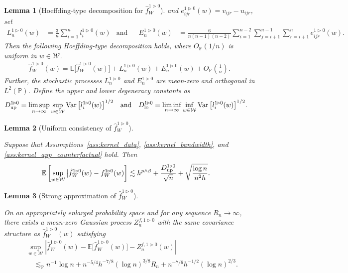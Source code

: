 \documentclass[11pt,lof]{puthesis}
\renewcommand{\P}{\ensuremath{\mathbb{P}}}
\newcommand{\E}{\ensuremath{\mathbb{E}}}
\newcommand{\cW}{\ensuremath{\mathcal{W}}}
\newcommand{\Dl}{\ensuremath{D_{\textup{lo}}}}
\newcommand{\Du}{\ensuremath{D_{\textup{up}}}}
\DeclareMathOperator{\Var}{Var}
\theoremstyle{break}
\newtheorem{lemma}{Lemma}[section]
\theoremstyle{proof}
\begin{document}
\begin{lemma}[Hoeffding-type decomposition for
$\hat f_W^{1 \triangleright 0}$]
and $e_{i j r}^{1 \triangleright 0}(w) = v_{i j r} - u_{i j r}$,
set
%
\begin{align*}
L_n^{1 \triangleright 0}(w)
&=
\frac{3}{n} \sum_{i=1}^n
l_i^{1 \triangleright 0}(w)
&\text{and} &
&E_n^{1 \triangleright 0}(w)
&=
\frac{6}{n(n-1)(n-2)}
\sum_{i=1}^{n-2}
\sum_{j=i+1}^{n-1}
\sum_{r=i+1}^n
e_{i j r}^{1 \triangleright 0}(w).
\end{align*}
%
Then the following Hoeffding-type decomposition holds,
where $O_\P(1/n)$ is uniform in $w \in \cW$.
%
\begin{align*}
\hat f_W^{1 \triangleright 0}(w)
= \E\big[\hat f_W^{1 \triangleright 0}(w)\big]
+ L_n^{1 \triangleright 0}(w)
+ E_n^{1 \triangleright 0}(w)
+ O_\P\left( \frac{1}{n} \right).
\end{align*}
%
Further,
the stochastic processes
$L_n^{1 \triangleright 0}$
and $E_n^{1 \triangleright 0}$
are mean-zero and orthogonal
in $L^2(\P)$.
Define the upper and lower degeneracy constants as
%
\begin{align*}
\Du^{1 \triangleright 0}
&=
\limsup_{n \to \infty}
\sup_{w \in \cW}
\Var\big[
l_i^{1 \triangleright 0}(w)
\big]^{1/2}
&\text{and}&
&
\Dl^{1 \triangleright 0}
&=
\liminf_{n \to \infty}
\inf_{w \in \cW}
\Var\big[
l_i^{1 \triangleright 0}(w)
\big]^{1/2}.
\end{align*}

\end{lemma}

\begin{lemma}[Uniform consistency of $\hat f_W^{1 \triangleright 0}$]
\label{lem:kernel_app_counterfactual_uniform_consistency}

Suppose that Assumptions~\ref{ass:kernel_data},
\ref{ass:kernel_bandwidth}, and \ref{ass:kernel_app_counterfactual} hold.
Then
%
\begin{align*}
\E\left[
\sup_{w \in \cW}
\big|\hat f_W^{1 \triangleright 0}(w)
- f_W^{1 \triangleright 0}(w)
\right]
&\lesssim
h^{p \wedge \beta}
+ \frac{\Du^{1 \triangleright 0}}{\sqrt n}
+ \sqrt{\frac{\log n}{n^2h}}.
\end{align*}

\end{lemma}

\begin{lemma}[Strong approximation of $\hat f_W^{1 \triangleright 0}$]
\label{lem:kernel_app_counterfactual_sa}

On an appropriately enlarged probability space
and for any sequence $R_n \to \infty$,
there exists a mean-zero Gaussian process
$Z_n^{f, 1 \triangleright 0}$
with the same covariance structure as
$\hat f_W^{1 \triangleright 0}(w)$ satisfying
%
\begin{align*}
&\sup_{w \in \cW}
\left|
\hat f_W^{1 \triangleright 0}(w)
- \E\big[\hat f_W^{1 \triangleright 0}(w)\big]
- Z_n^{f, 1 \triangleright 0}(w)
\right| \\
&\quad\lesssim_\P
n^{-1} \log n
+ n^{-5/4} h^{-7/8} (\log n)^{3/8} R_n
+ n^{-7/6} h^{-1/2} (\log n)^{2/3}.
\end{align*}

\end{lemma}
\end{document}
